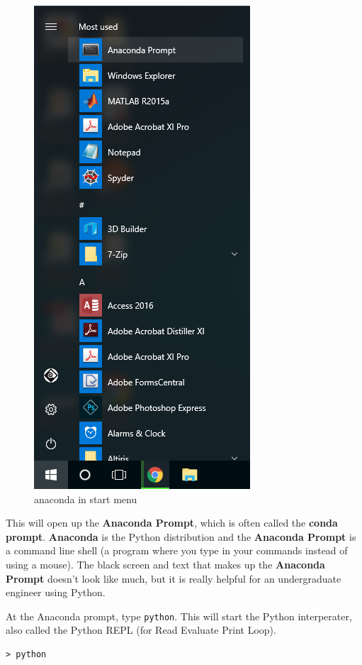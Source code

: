 \documentclass{book}
\makeatletter
\def\maxwidth{\ifdim\Gin@nat@width>\linewidth\linewidth
    \else\Gin@nat@width\fi}
\let\Oldincludegraphics\includegraphics
\renewcommand{\includegraphics}[1]{\Oldincludegraphics[width=.8\maxwidth]{#1}}
\makeatother
\begin{document}
\begin{figure}
\centering
\includegraphics{images/anaconda_from_start_menu.png}
\caption{anaconda in start menu}
\end{figure}

This will open up the \textbf{Anaconda Prompt}, which is often called
the \textbf{conda prompt}. \textbf{Anaconda} is the Python distribution
and the \textbf{Anaconda Prompt} is a command line shell (a program
where you type in your commands instead of using a mouse). The black
screen and text that makes up the \textbf{Anaconda Prompt} doesn't look
like much, but it is really helpful for an undergraduate engineer using
Python.

At the Anaconda prompt, type \lstinline!python!. This will start the
Python interperater, also called the Python REPL (for Read Evaluate
Print Loop).

\begin{lstlisting}
> python
\end{lstlisting}
\end{document}

